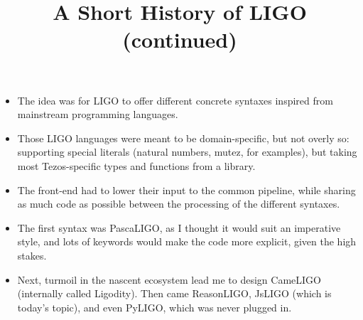 \documentclass[wide]{slides}
\begin{document}
\begin{slide}
  \title{A Short History of LIGO (continued)}

  \begin{itemize}

    \item The idea was for LIGO to offer different concrete syntaxes
      inspired from mainstream programming languages.

    \item Those LIGO languages were meant to be domain-specific, but
      not overly so: supporting special literals (natural numbers,
      mutez, for examples), but taking most Tezos-specific types and
      functions from a library.

    \item The front-end had to lower their input to the common
      pipeline, while sharing as much code as possible between the
      processing of the different syntaxes.

    \item The first syntax was \textsf{PascaLIGO}, as I thought it
      would suit an imperative style, and lots of keywords would make
      the code more explicit, given the high stakes.

    \item Next, turmoil in the nascent ecosystem lead me to design
      \textsf{CameLIGO} (internally called \textsf{Ligodity}). Then
      came \textsf{ReasonLIGO}, \textsf{JsLIGO} (which is today's
      topic), and even \textsf{PyLIGO}, which was never plugged in.

  \end{itemize}
\end{slide}
\end{document}
